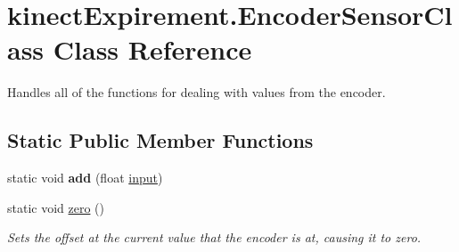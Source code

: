 \hypertarget{classkinect_expirement_1_1_encoder_sensor_class}{}\section{kinect\+Expirement.\+Encoder\+Sensor\+Class Class Reference}
\label{classkinect_expirement_1_1_encoder_sensor_class}


Handles all of the functions for dealing with values from the encoder.  


\subsection*{Static Public Member Functions}
\begin{DoxyCompactItemize}
\item 
static void {\bfseries add} (float \hyperlink{classkinect_expirement_1_1_encoder_sensor_class_aece38a4f443111c5f0b415463d751fe4}{input})\hypertarget{classkinect_expirement_1_1_encoder_sensor_class_a2c4b657a7796f3cee5fecd017a1f7a87}{}\label{classkinect_expirement_1_1_encoder_sensor_class_a2c4b657a7796f3cee5fecd017a1f7a87}

\item 
static void \hyperlink{classkinect_expirement_1_1_encoder_sensor_class_a37c1e134098db6ce4a196a91ff4b735e}{zero} ()
\begin{DoxyCompactList}\small\item\em Sets the offset at the current value that the encoder is at, causing it to zero. \end{DoxyCompactList}\end{DoxyCompactItemize}
